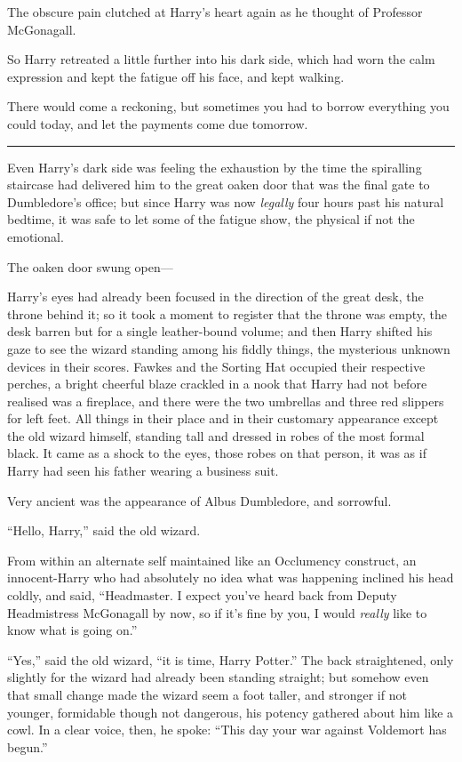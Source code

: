 The obscure pain clutched at Harry's heart again as he thought of
Professor McGonagall.

So Harry retreated a little further into his dark side, which had worn
the calm expression and kept the fatigue off his face, and kept walking.

There would come a reckoning, but sometimes you had to borrow everything
you could today, and let the payments come due tomorrow.

\begin{center}\rule{3in}{0.4pt}\end{center}

Even Harry's dark side was feeling the exhaustion by the time the
spiralling staircase had delivered him to the great oaken door that was
the final gate to Dumbledore's office; but since Harry was now
\emph{legally} four hours past his natural bedtime, it was safe to let
some of the fatigue show, the physical if not the emotional.

The oaken door swung open---

Harry's eyes had already been focused in the direction of the great
desk, the throne behind it; so it took a moment to register that the
throne was empty, the desk barren but for a single leather-bound volume;
and then Harry shifted his gaze to see the wizard standing among his
fiddly things, the mysterious unknown devices in their scores. Fawkes
and the Sorting Hat occupied their respective perches, a bright cheerful
blaze crackled in a nook that Harry had not before realised was a
fireplace, and there were the two umbrellas and three red slippers for
left feet. All things in their place and in their customary appearance
except the old wizard himself, standing tall and dressed in robes of the
most formal black. It came as a shock to the eyes, those robes on that
person, it was as if Harry had seen his father wearing a business suit.

Very ancient was the appearance of Albus Dumbledore, and sorrowful.

``Hello, Harry,'' said the old wizard.

From within an alternate self maintained like an Occlumency construct,
an innocent-Harry who had absolutely no idea what was happening inclined
his head coldly, and said, ``Headmaster. I expect you've heard back from
Deputy Headmistress McGonagall by now, so if it's fine by you, I would
\emph{really} like to know what is going on.''

``Yes,'' said the old wizard, ``it is time, Harry Potter.'' The back
straightened, only slightly for the wizard had already been standing
straight; but somehow even that small change made the wizard seem a foot
taller, and stronger if not younger, formidable though not dangerous,
his potency gathered about him like a cowl. In a clear voice, then, he
spoke: ``This day your war against Voldemort has begun.''

